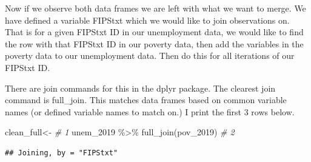 \documentclass[
]{book}
\newenvironment{Shaded}{\begin{snugshade}}{\end{snugshade}}
\newcommand{\CommentTok}[1]{\textcolor[rgb]{0.56,0.35,0.01}{\textit{#1}}}
\newcommand{\FunctionTok}[1]{\textcolor[rgb]{0.00,0.00,0.00}{#1}}
\newcommand{\NormalTok}[1]{#1}
\newcommand{\OtherTok}[1]{\textcolor[rgb]{0.56,0.35,0.01}{#1}}
\newcommand{\SpecialCharTok}[1]{\textcolor[rgb]{0.00,0.00,0.00}{#1}}
\begin{document}
Now if we observe both data frames we are left with what we want to merge. We have defined a variable FIPStxt which we would like to join observations on. That is for a given FIPStxt ID in our unemployment data, we would like to find the row with that FIPStxt ID in our poverty data, then add the variables in the poverty data to our unemployment data. Then do this for all iterations of our FIPStxt ID.

There are join commands for this in the dplyr package. The clearest join command is full\_join. This matches data frames based on common variable names (or defined variable names to match on.) I print the first 3 rows below.

\begin{Shaded}
\begin{Highlighting}[]
\NormalTok{clean\_full}\OtherTok{\textless{}{-}}                         \CommentTok{\# 1}
\NormalTok{  unem\_2019 }\SpecialCharTok{\%\textgreater{}\%} \FunctionTok{full\_join}\NormalTok{(pov\_2019)  }\CommentTok{\# 2}
\end{Highlighting}
\end{Shaded}

\begin{verbatim}
## Joining, by = "FIPStxt"
\end{verbatim}
\end{document}
